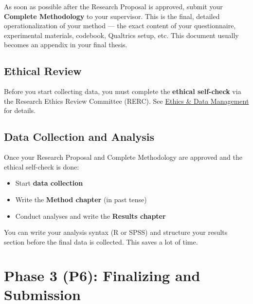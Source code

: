 \documentclass[
  11pt,
  a4paper,
]{scrbook}
\providecommand{\tightlist}{%
  \setlength{\itemsep}{0pt}\setlength{\parskip}{0pt}}\usepackage{longtable,booktabs,array}
\begin{document}
As soon as possible after the Research Proposal is approved, submit your
\textbf{Complete Methodology} to your supervisor. This is the final,
detailed operationalization of your method --- the exact content of your
questionnaire, experimental materials, codebook, Qualtrics setup, etc.
This document usually becomes an appendix in your final thesis.

\subsection{Ethical Review}\label{ethical-review}

Before you start collecting data, you must complete the \textbf{ethical
self-check} via the Research Ethics Review Committee (RERC). See
\href{ethics.qmd}{Ethics \& Data Management} for details.

\subsection{Data Collection and
Analysis}\label{data-collection-and-analysis}

Once your Research Proposal and Complete Methodology are approved and
the ethical self-check is done:

\begin{itemize}
\tightlist
\item
  Start \textbf{data collection}
\item
  Write the \textbf{Method chapter} (in past tense)
\item
  Conduct analyses and write the \textbf{Results chapter}
\end{itemize}

\begin{tcolorbox}[enhanced jigsaw, bottomrule=.15mm, opacityback=0, toprule=.15mm, colframe=quarto-callout-tip-color-frame, left=2mm, rightrule=.15mm, title=\textcolor{quarto-callout-tip-color}{\faLightbulb}\hspace{0.5em}{Prepare analyses before data comes in}, colbacktitle=quarto-callout-tip-color!10!white, bottomtitle=1mm, colback=white, breakable, toptitle=1mm, titlerule=0mm, leftrule=.75mm, arc=.35mm, opacitybacktitle=0.6, coltitle=black]

You can write your analysis syntax (R or SPSS) and structure your
results section before the final data is collected. This saves a lot of
time.

\end{tcolorbox}

\section{Phase 3 (P6): Finalizing and
Submission}\label{phase-3-p6-finalizing-and-submission}
\end{document}
